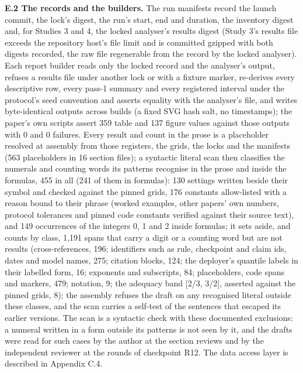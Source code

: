 \documentclass[11pt,letterpaper]{article}
\begin{document}
\textbf{E.2 The records and the builders.} The run manifests record the launch commit, the lock's digest, the run's start, end and duration, the inventory digest and, for Studies 3 and 4, the locked analyser's results digest (Study 3's results file exceeds the repository host's file limit and is committed gzipped with both digests recorded, the raw file regenerable from the record by the locked analyser). Each report builder reads only the locked record and the analyser's output, refuses a results file under another lock or with a fixture marker, re-derives every descriptive row, every pass-1 summary and every registered interval under the protocol's seed convention and asserts equality with the analyser's file, and writes byte-identical outputs across builds (a fixed SVG hash salt, no timestamps); the paper's own scripts assert 359 table and 137 figure values against those outputs with 0 and 0 failures. Every result and count in the prose is a placeholder resolved at assembly from those registers, the grids, the locks and the manifests (563 placeholders in 16 section files); a syntactic literal scan then classifies the numerals and counting words its patterns recognise in the prose and inside the formulas, 455 in all (241 of them in formulas): 130 settings written beside their symbol and checked against the pinned grids, 176 constants allow-listed with a reason bound to their phrase (worked examples, other papers' own numbers, protocol tolerances and pinned code constants verified against their source text), and 149 occurrences of the integers 0, 1 and 2 inside formulas; it sets aside, and counts by class, 1,191 spans that carry a digit or a counting word but are not results (cross-references, 196; identifiers such as rule, checkpoint and claim ids, dates and model names, 275; citation blocks, 124; the deployer's quantile labels in their labelled form, 16; exponents and subscripts, 84; placeholders, code spans and markers, 479; notation, 9; the adequacy band {[}2/3, 3/2{]}, asserted against the pinned grids, 8); the assembly refuses the draft on any recognised literal outside these classes, and the scan carries a self-test of the sentences that escaped its earlier versions. The scan is a syntactic check with these documented exclusions: a numeral written in a form outside its patterns is not seen by it, and the drafts were read for such cases by the author at the section reviews and by the independent reviewer at the rounds of checkpoint R12. The data access layer is described in Appendix C.4.
\end{document}
